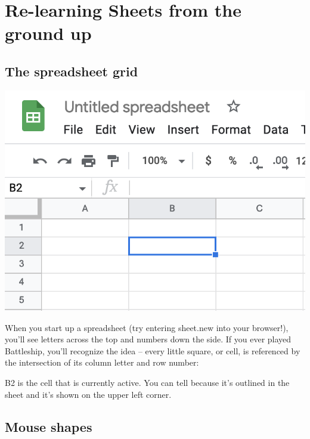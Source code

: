 \documentclass[
  letterpaper,
  DIV=11,
  numbers=noendperiod]{scrreprt}
\begin{document}
\hypertarget{re-learning-sheets-from-the-ground-up}{%
\section{Re-learning Sheets from the ground
up}\label{re-learning-sheets-from-the-ground-up}}

\hypertarget{the-spreadsheet-grid}{%
\subsection{The spreadsheet grid}\label{the-spreadsheet-grid}}

\includegraphics{./images/sheets-refresher-battleship.png}

When you start up a spreadsheet (try entering sheet.new into your
browser!), you'll see letters across the top and numbers down the side.
If you ever played Battleship, you'll recognize the idea -- every little
square, or cell, is referenced by the intersection of its column letter
and row number:

B2 is the cell that is currently active. You can tell because it's
outlined in the sheet and it's shown on the upper left corner.

\hypertarget{mouse-shapes}{%
\subsection{Mouse shapes}\label{mouse-shapes}}
\end{document}
